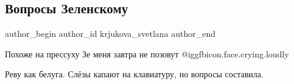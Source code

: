  
 
 
 
 
 
\subsection{Вопросы Зеленскому}
\label{sec:25_11_2021.fb.krjukova_svetlana.1.voprosy_zelenskomu}
 
\ifcmt
 author_begin
   author_id krjukova_svetlana
 author_end
\fi

Похоже на прессуху Зе меня завтра не позовут  @igg{fbicon.face.crying.loudly} 

Реву как белуга. Слёзы капают на клавиатуру, но вопросы составила. 

